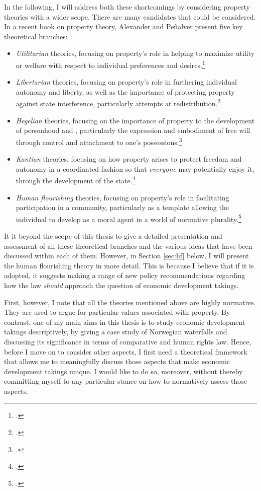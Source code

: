 In the following, I will address both these shortcomings by considering property theories with a wider scope. There are many candidates that could be considered. In a recent book on property theory, Alexander and Pe\~{n}alver present five key theoretical branches: 
\begin{itemize}
\item {\it Utilitarian} theories, focusing on property's role in helping to maximize utility or welfare with respect to individual preferences and desires.\footnote{\cite[Chapter 1]{alexander10}.} 
\item {\it Libertarian} theories, focusing on property's role in furthering individual autonomy and liberty, as well as the importance of protecting property against state interference, particularly attempts at redistribution.\footnote{\cite[Chapter 2]{alexander10}.} 
\item {\it Hegelian} theories, focusing on the importance of property to the development of personhood and , particularly the expression and embodiment of free will through control and attachment to one's possessions.\footnote{\cite[Chapter 3]{alexander10}.}
\item {\it Kantian} theories, focusing on how property arises to protect freedom and autonomy in a coordinated fashion so that {\it everyone} may potentially enjoy it, through the development of the state.\footnote{\cite[Chapter 4]{alexander10}.}
\item {\it  Human flourishing} theories, focusing on property's role in facilitating participation in a community, particularly as a template allowing the individual to develop as a moral agent in a world of normative plurality.\footnote{\cite[Chapter 5]{alexander10}.}
\end{itemize}

It it beyond the scope of this thesis to give a detailed presentation and assessment of all these theoretical branches and the various ideas that have been discussed within each of them. However, in Section \ref{sec:hf} below, I will present the human flourishing theory in more detail. This is because I believe that if it is adopted, it suggests making a range of new policy recommendations regarding how the law {\it should} approach the question of economic development takings. 

First, however, I note that all the theories mentioned above are highly normative. They are used to argue for particular values associated with property. By contrast, one of my main aims in this thesis is to study economic development takings descriptively, by giving a case study of Norwegian waterfalls and discussing its significance in terms of comparative and human rights law. Hence, before I move on to consider other aspects, I first need a theoretical framework that allows me to meaningfully discuss those aspects that make economic development takings unique. I would like to do so, moreover, without thereby committing myself to any particular stance on how to normatively assess those aspects. 

